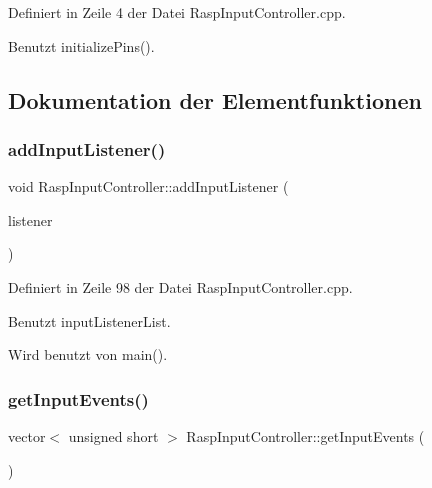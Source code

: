 Definiert in Zeile 4 der Datei Rasp\+Input\+Controller.\+cpp.



Benutzt initialize\+Pins().



\subsection{Dokumentation der Elementfunktionen}
\mbox{\label{class_rasp_input_controller_a31d6f6befaea44931f0010175bfe1a17}} 
\subsubsection{\texorpdfstring{add\+Input\+Listener()}{addInputListener()}}
{\footnotesize\ttfamily void Rasp\+Input\+Controller\+::add\+Input\+Listener (\begin{DoxyParamCaption}\item[{\hyperlink{class_input_listener}{Input\+Listener} \&}]{listener }\end{DoxyParamCaption})}



Definiert in Zeile 98 der Datei Rasp\+Input\+Controller.\+cpp.



Benutzt input\+Listener\+List.



Wird benutzt von main().

\mbox{\label{class_rasp_input_controller_a95a42703b4c0bca34ba966745bad5dff}} 
\subsubsection{\texorpdfstring{get\+Input\+Events()}{getInputEvents()}}
{\footnotesize\ttfamily vector$<$ unsigned short $>$ Rasp\+Input\+Controller\+::get\+Input\+Events (\begin{DoxyParamCaption}{ }\end{DoxyParamCaption})\hspace{0.3cm}{\ttfamily [private]}}



